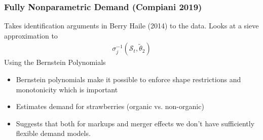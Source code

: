 \begin{frame}
\frametitle{Fully Nonparametric Demand (Compiani 2019)}
Takes identification arguments in Berry Haile (2014) to the data. Looks at a sieve approximation to
\begin{align*}
\sigma_{j}^{-1}(\mathcal{S}_t,\widetilde{\theta}_2)
\end{align*}
Using the \alert{Bernstein Polynomials}
\begin{itemize}
\item Bernstein polynomials make it possible to enforce shape restrictions and \alert{monotonicity} which is important
\item Estimates demand for strawberries (organic vs. non-organic)
\item Suggests that both for markups and merger effects we don't have sufficiently flexible demand models.
\end{itemize}
\end{frame}


%
%



%





